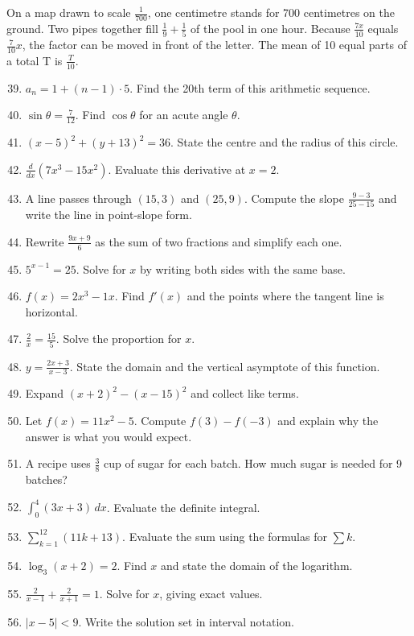 \documentclass[11pt]{article}
\begin{document}
On a map drawn to scale \label{eq077}$\frac{1}{700}$, one centimetre stands for 700 centimetres on the ground. Two pipes together fill \label{eq078}$\frac{1}{9} + \frac{1}{5}$ of the pool in one hour. Because \label{eq079}$\frac{7x}{10}$ equals \label{eq080}$\frac{7}{10}x$, the factor can be moved in front of the letter. The mean of 10 equal parts of a total T is \label{eq081}$\frac{T}{10}$.
\begin{enumerate}
\setcounter{enumi}{38}
\setlength{\itemsep}{8pt}
\item \label{eq082}$a_n = 1 + (n - 1) \cdot 5$. Find the 20th term of this arithmetic sequence.
\item \label{eq083}$\sin\theta = \frac{7}{12}$. Find $\cos\theta$ for an acute angle $\theta$.
\item \label{eq084}$(x - 5)^2 + (y + 13)^2 = 36$. State the centre and the radius of this circle.
\item \label{eq085}$\frac{d}{dx}\left(7x^3 - 15x^2\right)$. Evaluate this derivative at $x = 2$.
\item A line passes through $(15, 3)$ and $(25, 9)$. Compute the slope \label{eq086}$\frac{9 - 3}{25 - 15}$ and write the line in point-slope form.
\item Rewrite \label{eq087}$\frac{9x + 9}{6}$ as the sum of two fractions and simplify each one.
\item \label{eq088}$5^{x - 1} = 25$. Solve for $x$ by writing both sides with the same base.
\item \label{eq089}$f(x) = 2x^3 - 1x$. Find $f'(x)$ and the points where the tangent line is horizontal.
\item \label{eq090}$\frac{2}{x} = \frac{15}{5}$. Solve the proportion for $x$.
\item \label{eq091}$y = \frac{2x + 3}{x - 3}$. State the domain and the vertical asymptote of this function.
\item Expand \label{eq092}$(x + 2)^2 - (x - 15)^2$ and collect like terms.
\item Let $f(x) = 11x^2 - 5$. Compute \label{eq093}$f(3) - f(-3)$ and explain why the answer is what you would expect.
\item A recipe uses \label{eq094}$\frac{3}{8}$ cup of sugar for each batch. How much sugar is needed for 9 batches?
\item \label{eq095}$\int_0^4 (3x + 3)\,dx$. Evaluate the definite integral.
\item \label{eq096}$\sum_{k=1}^{12} (11k + 13)$. Evaluate the sum using the formulas for $\sum k$.
\item \label{eq097}$\log_{3}(x + 2) = 2$. Find $x$ and state the domain of the logarithm.
\item \label{eq098}$\frac{2}{x - 1} + \frac{2}{x + 1} = 1$. Solve for $x$, giving exact values.
\item \label{eq099}$|x - 5| < 9$. Write the solution set in interval notation.
\end{enumerate}
\end{document}
